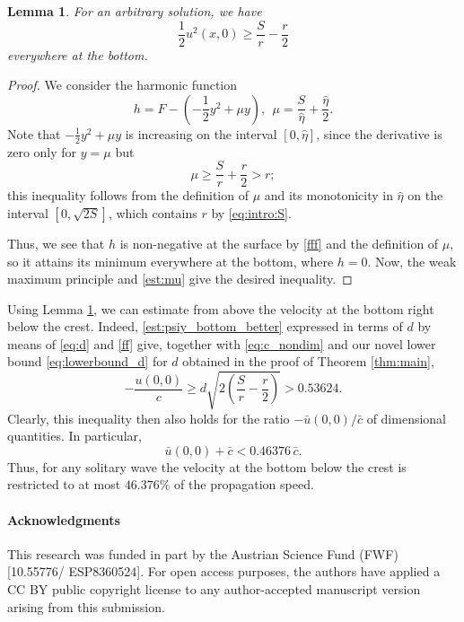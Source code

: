 \documentclass{amsart}
\newtheorem{lemma}[theorem]{Lemma}
\theoremstyle{definition}
\begin{document}
\begin{lemma} \label{l:lower_bottom}
	For an arbitrary solution, we have
	\begin{equation}\label{est:psiy_bottom_better}
		\frac12 u^2(x,0) \geq \frac{S}{r} - \frac{r}{2}
	\end{equation}
	everywhere at the bottom.
\end{lemma}
\begin{proof}
	We consider the harmonic function
	\[
	h = F - \left(-\frac12 y^2 + \mu y\right), \ \ \mu = \frac{S}{\hat{\eta}} + \frac{\hat{\eta}}{2}.
	\]
	Note that $-\frac12 y^2 + \mu y$ is increasing on the interval $[0, \hat{\eta}]$, since the derivative is zero only for $y = \mu$ but 
	\begin{equation}\label{est:mu}
		\mu \ge \frac{S}{r} + \frac{r}{2} > r;
	\end{equation}
	this inequality follows from the definition of $\mu$ and its monotonicity in $\hat{\eta}$ on the interval $[0, \sqrt{2S}]$, which contains $r$ by \eqref{eq:intro:S}.
	
	Thus, we see that $h$ is non-negative at the surface by \eqref{fff} and the definition of $\mu$, so it attains its minimum everywhere at the bottom, where $h = 0$. Now, the weak maximum principle and \eqref{est:mu} give the desired inequality.
\end{proof}

Using Lemma \ref{l:lower_bottom}, we can estimate from above the velocity at the bottom right below the crest. Indeed, \eqref{est:psiy_bottom_better} expressed in terms of $d$ by means of \eqref{eq:d} and \eqref{ff} give, together with \eqref{eq:c_nondim} and our novel lower bound \eqref{eq:lowerbound_d} for $d$ obtained in the proof of Theorem \ref{thm:main},
\[
-\frac{u(0,0)}{c} \ge d\sqrt{2\left(\frac Sr-\frac r2\right)} > 0.53624.
\]
Clearly, this inequality then also holds for the ratio $-\bar u(0,0)/\bar c$ of dimensional quantities. In particular,
\[
\bar u(0,0)+\bar c < 0.46376\, \bar c.
\]
Thus, for any solitary wave the velocity at the bottom below the crest is restricted to at most $46.376\%$ of the propagation speed.

\paragraph{Acknowledgments}{This research was funded in part by the Austrian Science Fund (FWF) [10.55776/ ESP8360524]. For open access purposes, the authors have applied a CC BY public copyright license to any author-accepted manuscript version arising from this submission.}

	

\end{document}
